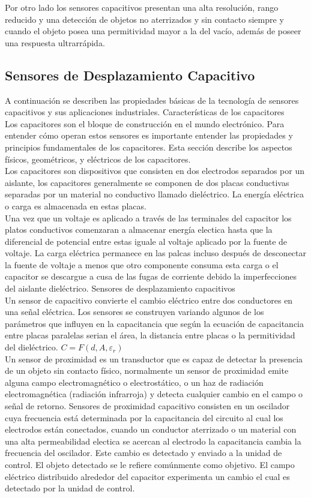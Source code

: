 Por otro lado los sensores capacitivos presentan una alta resolución, rango reducido y una detección de objetos no aterrizados y sin contacto siempre y cuando el objeto posea una permitividad mayor a la del vacío, además de poseer una respuesta ultrarrápida.

\subsection{Sensores de Desplazamiento Capacitivo}
A continuación se describen las propiedades básicas de la tecnología de sensores capacitivos y sus aplicaciones industriales. 
Características de los capacitores\\
Los capacitores son el bloque de construcción en el mundo electrónico. Para entender cómo operan estos sensores es importante entender las propiedades y principios fundamentales de los capacitores. Esta sección describe los aspectos físicos, geométricos, y eléctricos de los capacitores.\\
Los capacitores son dispositivos que consisten en dos electrodos separados por un aislante, los capacitores generalmente se componen de dos placas conductivas separadas por un material no conductivo llamado dieléctrico. La energía eléctrica o carga es almacenada en estas placas. \\
Una vez que un voltaje es aplicado a través de las terminales del capacitor los platos conductivos comenzaran a almacenar energía electica hasta que la diferencial de potencial entre estas iguale al voltaje aplicado por la fuente de voltaje.
La carga eléctrica permanece en las palcas incluso después de desconectar la fuente de voltaje a menos que otro componente consuma esta carga o el capacitor se descargue a cusa de las fugas de corriente debido la imperfecciones del aislante dieléctrico.
Sensores de desplazamiento capacitivos\\
Un sensor de capacitivo convierte el cambio eléctrico entre dos conductores en una señal eléctrica. Los sensores se construyen variando algunos de los parámetros que influyen en la capacitancia que según  la ecuación  de capacitancia entre placas paralelas serian el área, la distancia entre placas  o la permitividad del dieléctrico.
$C=F(d,A,\varepsilon_r)$\\
Un sensor de proximidad es un transductor que es capaz de detectar la presencia de un objeto sin contacto físico, normalmente un sensor de proximidad emite alguna campo electromagnético o electrostático, o un haz de radiación electromagnética (radiación infrarroja) y detecta cualquier cambio en el campo o señal de retorno. Sensores de proximidad capacitivo consisten en un oscilador cuya frecuencia está determinada por la capacitancia del circuito al cual los electrodos están conectados, cuando un conductor aterrizado o un material con una alta permeabilidad electica se acercan al electrodo la capacitancia cambia la frecuencia del oscilador. Este cambio es detectado y enviado a la unidad de control. El objeto detectado se le refiere comúnmente como objetivo.
El campo eléctrico distribuido alrededor del capacitor experimenta un cambio el cual es detectado por la unidad de control.

